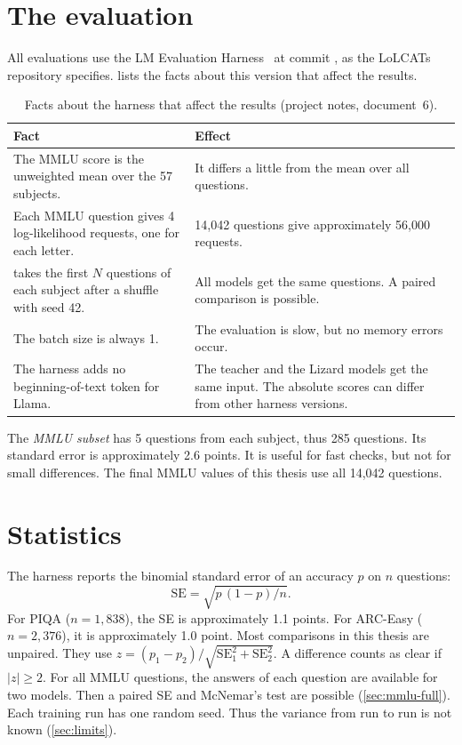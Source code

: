 \section{The evaluation}
\label{sec:eval}

All evaluations use the LM Evaluation Harness~\cite{lmeval} at commit , as the LoLCATs repository specifies.  lists the facts about this version that affect the results.

\begin{table}[ht]
\centering
\small
\caption[Facts about the harness that affect the results]{Facts about the harness that affect the results (project notes, document~6).}
\label{tab:harness}
\begin{tabularx}{\linewidth}{@{}LL@{}}
\toprule
Fact & Effect \\
\midrule
The MMLU score is the unweighted mean over the 57 subjects. & It differs a little from the mean over all questions. \\
Each MMLU question gives 4 log-likelihood requests, one for each letter. & 14,042 questions give approximately 56,000 requests. \\
 takes the first $N$ questions of each subject after a shuffle with seed 42. & All models get the same questions. A paired comparison is possible. \\
The batch size is always 1. & The evaluation is slow, but no memory errors occur. \\
The harness adds no beginning-of-text token for Llama. & The teacher and the Lizard models get the same input. The absolute scores can differ from other harness versions. \\
\bottomrule
\end{tabularx}
\end{table}

The \emph{MMLU subset} has 5 questions from each subject, thus 285 questions. Its standard error is approximately 2.6 points. It is useful for fast checks, but not for small differences. The final MMLU values of this thesis use all 14,042 questions.

\section{Statistics}
\label{sec:stats}

The harness reports the binomial standard error of an accuracy $p$ on $n$ questions:
\begin{equation}
\mathrm{SE} = \sqrt{p\,(1 - p) / n} .
\end{equation}
For PIQA ($n = 1{,}838$), the SE is approximately 1.1 points. For ARC-Easy ($n = 2{,}376$), it is approximately 1.0 point. Most comparisons in this thesis are unpaired. They use $z = (p_1 - p_2) / \sqrt{\mathrm{SE}_1^2 + \mathrm{SE}_2^2}$. A difference counts as clear if $|z| \ge 2$. For all MMLU questions, the answers of each question are available for two models. Then a paired SE and McNemar's test are possible (\cref{sec:mmlu-full}). Each training run has one random seed. Thus the variance from run to run is not known (\cref{sec:limits}).

